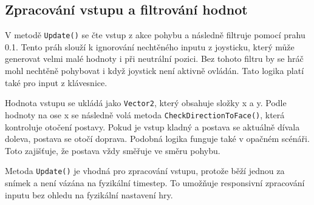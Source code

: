 \subsection{Zpracování vstupu a filtrování hodnot}

V metodě \texttt{Update()} se čte vstup z akce pohybu a následně filtruje pomocí prahu 0.1. Tento práh slouží k ignorování nechtěného inputu z joysticku, který může generovat velmi malé hodnoty i při neutrální pozici. Bez tohoto filtru by se hráč mohl nechtěně pohybovat i když joystick není aktivně ovládán. Tato logika platí také pro input z klávesnice.

Hodnota vstupu se ukládá jako \texttt{Vector2}, který obsahuje složky x a y. Podle hodnoty na ose x se následně volá metoda \texttt{CheckDirectionToFace()}, která kontroluje otočení postavy. Pokud je vstup kladný a postava se aktuálně dívala doleva, postava se otočí doprava. Podobná logika funguje také v opačném scénáři. Toto zajišťuje, že postava vždy směřuje ve směru pohybu.

Metoda \texttt{Update()} je vhodná pro zpracování vstupu, protože běží jednou za snímek a není vázána na fyzikální timestep. To umožňuje responsivní zpracování inputu bez ohledu na fyzikální nastavení hry.